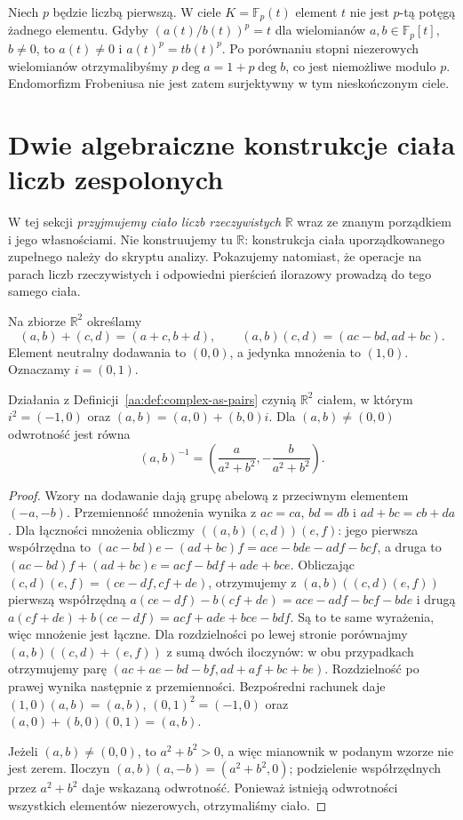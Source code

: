 \begin{przyklad}
\label{aa:prz:frobenius-not-surjective}
Niech $p$ będzie liczbą pierwszą. W ciele
$K=\mathbb F_p(t)$ element $t$ nie jest
$p$-tą potęgą żadnego elementu. Gdyby
$(a(t)/b(t))^p=t$ dla wielomianów $a,b\in\mathbb F_p[t]$,
$b\ne0$, to $a(t)\ne0$ i $a(t)^p=t b(t)^p$.
Po porównaniu stopni niezerowych wielomianów
otrzymalibyśmy $p\deg a=1+p\deg b$, co jest
niemożliwe modulo $p$. Endomorfizm Frobeniusa
nie jest zatem surjektywny w tym nieskończonym ciele.
\end{przyklad}

\section{Dwie algebraiczne konstrukcje ciała liczb zespolonych}
W tej sekcji \emph{przyjmujemy ciało liczb rzeczywistych}
$\mathbb R$ wraz ze znanym porządkiem i jego własnościami.
Nie konstruujemy tu $\mathbb R$: konstrukcja ciała
uporządkowanego zupełnego należy do skryptu analizy.
Pokazujemy natomiast, że operacje na parach liczb
rzeczywistych i odpowiedni pierścień ilorazowy prowadzą
do tego samego ciała.

\begin{definicja}
\label{aa:def:complex-as-pairs}
Na zbiorze $\mathbb R^2$ określamy
\[
(a,b)+(c,d)=(a+c,b+d),\qquad
(a,b)(c,d)=(ac-bd,ad+bc).
\]
Element neutralny dodawania to $(0,0)$, a jedynka
mnożenia to $(1,0)$. Oznaczamy $i=(0,1)$.
\end{definicja}

\begin{twierdzenie}
\label{aa:tw:complex-pairs-field}
Działania z Definicji~\ref{aa:def:complex-as-pairs}
czynią $\mathbb R^2$ ciałem,
w którym $i^2=(-1,0)$ oraz
$(a,b)=(a,0)+(b,0)i$.
Dla $(a,b)\ne(0,0)$ odwrotność jest równa
\[
(a,b)^{-1}=\left(\frac a{a^2+b^2},
 -\frac b{a^2+b^2}\right).
\]
\end{twierdzenie}
\begin{proof}
Wzory na dodawanie dają grupę abelową z przeciwnym
elementem $(-a,-b)$. Przemienność mnożenia
wynika z $ac=ca$, $bd=db$ i $ad+bc=cb+da$.
Dla łączności mnożenia obliczmy
$((a,b)(c,d))(e,f)$: jego pierwsza współrzędna to
$(ac-bd)e-(ad+bc)f=ace-bde-adf-bcf$,
a druga to $(ac-bd)f+(ad+bc)e=acf-bdf+ade+bce$.
Obliczając $(c,d)(e,f)=(ce-df,cf+de)$, otrzymujemy
z $(a,b)((c,d)(e,f))$ pierwszą współrzędną
$a(ce-df)-b(cf+de)=ace-adf-bcf-bde$
i drugą $a(cf+de)+b(ce-df)=acf+ade+bce-bdf$.
Są to te same wyrażenia, więc mnożenie jest łączne.
Dla rozdzielności po lewej stronie porównajmy
$(a,b)((c,d)+(e,f))$ z sumą dwóch iloczynów:
w obu przypadkach otrzymujemy parę
$(ac+ae-bd-bf,ad+af+bc+be)$.
Rozdzielność po prawej wynika następnie z przemienności. Bezpośredni rachunek daje
$(1,0)(a,b)=(a,b)$, $(0,1)^2=(-1,0)$
oraz $(a,0)+(b,0)(0,1)=(a,b)$.

Jeżeli $(a,b)\ne(0,0)$, to $a^2+b^2>0$, a więc
mianownik w podanym wzorze nie jest zerem. Iloczyn
$(a,b)(a,-b)=(a^2+b^2,0)$; podzielenie współrzędnych
przez $a^2+b^2$ daje wskazaną odwrotność.
Ponieważ istnieją odwrotności wszystkich elementów
niezerowych, otrzymaliśmy ciało.
\end{proof}

